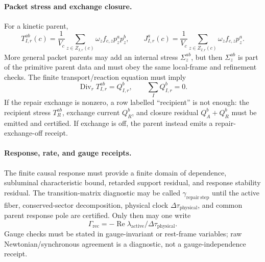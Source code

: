 \paragraph{Packet stress and exchange closure.}
For a kinetic parent,
\[
T_{I,r}^{ab}(c)=
\frac{1}{V_c}\sum_{z\in Z_{I,r}(c)}\omega_zf_{c,z}p_z^ap_z^b ,
\qquad
J_{I,r}^a(c)=
\frac{1}{V_c}\sum_{z\in Z_{I,r}(c)}\omega_zf_{c,z}p_z^a .
\]
More general packet parents may add an internal stress \(\Sigma_z^{ab}\), but
then \(\Sigma_z^{ab}\) is part of the primitive parent data and must obey the
same local-frame and refinement checks.  The finite transport/reaction equation
must imply
\[
\operatorname{Div}_r T_{I,r}^{ab}=Q_{I,r}^b,\qquad
\sum_I Q_{I,r}^b=0.
\]
If the repair exchange is nonzero, a row labelled ``recipient'' is not enough:
the recipient stress \(T_R^{ab}\), exchange current \(Q_R^b\), and closure
residual \(Q_A^b+Q_R^b\) must be emitted and certified.  If exchange is off,
the parent instead emits a repair-exchange-off receipt.

\paragraph{Response, rate, and gauge receipts.}
The finite causal response must provide a finite domain of dependence,
subluminal characteristic bound, retarded support residual, and response
stability residual.  The transition-matrix diagnostic may be called
\(\gamma_{\mathrm{repair\ step}}\) until the active fiber, conserved-sector
decomposition, physical clock \(\Delta\tau_{\mathrm{physical}}\), and common
parent response pole are certified.  Only then may one write
\[
\Gamma_{\mathrm{rec}}=
-\operatorname{Re}\lambda_{\mathrm{active}}/\Delta\tau_{\mathrm{physical}} .
\]
Gauge checks must be stated in gauge-invariant or rest-frame variables; raw
Newtonian/synchronous agreement is a diagnostic, not a gauge-independence
receipt.

